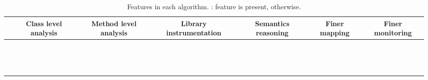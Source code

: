 \begin{table}[t]
	\vspace{-3ex}
	\scriptsize
	\centering
	\addtolength{\tabcolsep}{-1.2em}
	\caption{Features in each \Tool algorithm. {\cmark}: feature is present, {\xmark} otherwise.}
	\vspace{-3ex}
	\setlength{\extrarowheight}{3pt}
	\begin{tabular}{lcccccc}
	\toprule
	& \parbox{1.4cm}{\centering Class level analysis} & \parbox{1.4cm}{\centering Method level analysis} & \parbox{1.4cm}{\centering Library instrumentation} & \parbox{1.4cm}{\centering Semantics reasoning} & \parbox{1.4cm}{\centering Finer \spec mapping} & \parbox{1.4cm}{\centering Finer monitoring} \\
	\hline
	\psOneC & \cmark & \xmark & \cmark & \xmark & \xmark & \xmark \\
	\hline
	\FINEOneC & \cmark & \xmark & \cmark & \cmark & \xmark & \xmark \\
	\hline
	\HyRTSOneC & \cmark & \cmark & \cmark & \xmark & \xmark & \xmark \\
	\hline
	\HyRTSSOneC & \cmark & \cmark & \cmark & \xmark & \cmark & \xmark \\
	\hline
	\METHODSOneC & \xmark & \cmark & \cmark & \xmark & \xmark & \xmark \\
	\hline
	\METHODSFAOneC & \xmark & \cmark & \cmark & \xmark & \cmark & \cmark \\
	\hline
	\METHODSSOneC & \xmark & \cmark & \cmark & \xmark & \cmark & \xmark \\
	\hline
	\psThreeCL & \cmark & \xmark & \xmark & \xmark & \xmark & \xmark \\
	\hline
	\FINEThreeCL & \cmark & \xmark & \xmark & \cmark & \xmark & \xmark \\
	\hline
	\HyRTSThreeCL & \cmark & \cmark & \xmark & \xmark & \xmark & \xmark \\
	\hline
	\HyRTSSThreeCL & \cmark & \cmark & \xmark & \xmark & \cmark & \xmark \\
	\hline
	\METHODSThreeCL & \xmark & \cmark & \xmark & \xmark & \xmark & \xmark \\
	\hline
	\METHODSFAThreeCL & \xmark & \cmark & \xmark & \xmark & \cmark & \cmark \\
	\hline
	\METHODSSThreeCL & \xmark & \cmark & \xmark & \xmark & \cmark & \xmark \\
	\bottomrule
	\end{tabular}
\label{table:summary-grid}
\vspace{-6ex}
\end{table}